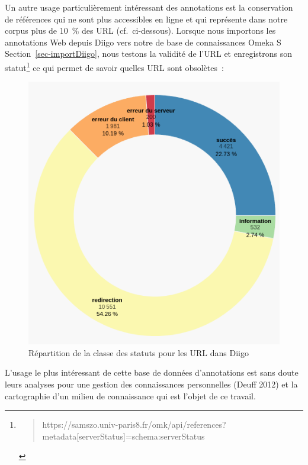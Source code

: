 \documentclass[
  letterpaper,
  DIV=11,
  numbers=noendperiod]{scrreprt}
\begin{document}
Un autre usage particulièrement intéressant des annotations est la
conservation de références qui ne sont plus accessibles en ligne et qui
représente dans notre corpus plus de 10~\% des URL (cf.~ci-dessous).
Lorsque nous importons les annotations Web depuis Diigo vers notre de
base de connaissances Omeka S Section~\ref{sec-importDiigo}, nous
testons la validité de l'URL et enregistrons son statut\footnote{\begin{quote}
  https://samszo.univ-paris8.fr/omk/api/references?metadata{[}serverStatus{]}=schema:serverStatus
  \end{quote}} ce qui permet de savoir quelles URL sont obsolètes~:

\begin{figure}

{\centering \includegraphics{media/10000001000001E6000001FDFBA335D820BED6E2.png}

}

\caption{\label{fig-statutUrlDiigo}Répartition de la classe des statuts
pour les URL dans Diigo}

\end{figure}

L'usage le plus intéressant de cette base de données d'annotations est
sans doute leurs analyses pour une gestion des connaissances
personnelles (Deuff 2012) et la cartographie d'un milieu de connaissance
qui est l'objet de ce travail.
\end{document}
